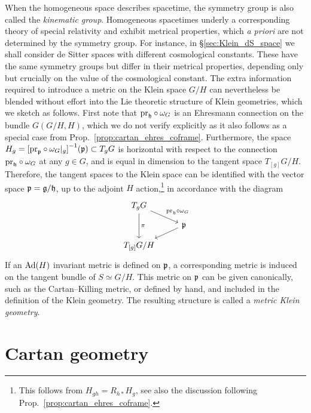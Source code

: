 \documentclass[
final,
11pt,
a4paper,
DIV=11,
headinclude=true,
footinclude=false,
bibliography=totoc,
twoside=true,  %
BCOR=5mm
]{scrbook}
\begin{document}
When the homogeneous space describes spacetime, the symmetry 
group is also called the \emph{kinematic group}. Homogeneous 
spacetimes underly a corresponding theory of special relativity 
and exhibit metrical properties, which \emph{a priori} are not 
determined by the symmetry group. For instance, in 
\S\ref{sec:Klein_dS_space} we shall consider de Sitter spaces 
with different cosmological constants.  These have the same 
symmetry groups but differ in their metrical properties, 
depending only but crucially on the value of the cosmological 
constant. The extra information required to introduce a metric on 
the Klein space $G/H$ can nevertheless be blended without effort 
into the Lie theoretic structure of Klein geometries, which we 
sketch as follows.  First note that $\mathrm{pr}_\mathfrak{h} \circ 
\omega_G$ is an Ehresmann connection on the bundle $G(G/H,H)$, 
which we do not verify explicitly as it also follows as a special 
case from Prop.~\ref{prop:cartan_ehres_coframe}. Furthermore, the 
space $H_g = {[\mathrm{pr}_\mathfrak{p} \circ \omega_G|_g]}^{-1}(\mathfrak{p}) 
\subset T_g G$ is horizontal with respect to the connection 
$\mathrm{pr}_\mathfrak{h} \circ \omega_G$ at any $g \in G$, and is equal 
in dimension to the tangent space $T_{[g]}G/H$.  Therefore, the 
tangent spaces to the Klein space can be identified with the 
vector space $\mathfrak{p} = \mathfrak{g}/\mathfrak{h}$, up to the adjoint $H$ 
action,\footnote{This follows from $H_{gh} = R_{h*}H_g$, see also 
  the discussion following 
  Prop.~\ref{prop:cartan_ehres_coframe}.} in accordance with the 
diagram
\begin{equation*}
\begin{tikzcd}[
  row sep=8pt
  ]
  T_g G \arrow[dd, "\pi"]
      \arrow[dr, "\mrm{pr}_\mf{h} \circ \omega_G"]
  & \\
  {} & \mf{p} \arrow[dl]
  \\
  T_{[g]}G/H &
\end{tikzcd}
\end{equation*}
If an $\operatorname{Ad}(H)$ invariant metric is defined on $\mathfrak{p}$, a 
corresponding metric is induced on the tangent bundle of $S 
\simeq G/H$. This metric on $\mathfrak{p}$ can be given canonically, 
such as the Cartan--Killing metric, or defined by hand, and 
included in the definition of the Klein geometry. The resulting 
structure is called a \emph{metric Klein geometry}.

\section{Cartan geometry}
\label{sec:Cartan_geo}
\end{document}
